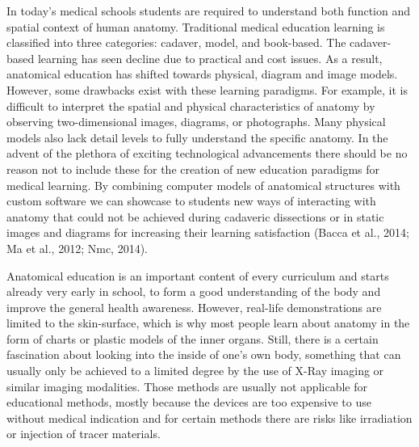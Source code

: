 In today’s medical schools students are required to understand both function and spatial context of human anatomy. Traditional medical education learning is classified into three categories: cadaver, model, and book-based. The cadaver-based learning has seen decline due to practical and cost issues. As a result, anatomical education has shifted towards physical, diagram and image models. However, some drawbacks exist with these learning paradigms. For example, it is difficult to interpret the spatial and physical characteristics of anatomy by observing two-dimensional images, diagrams, or photographs. Many physical models also lack detail levels to fully understand the specific anatomy. 
In the advent of the plethora of exciting technological advancements there should be no reason not to include these for the creation of new education paradigms for medical learning. By combining computer models of anatomical structures with custom software we can showcase to students new ways of interacting with anatomy that could not be achieved during cadaveric dissections or in static images and diagrams for increasing their learning satisfaction (Bacca et al., 2014; Ma et al., 2012; Nmc, 2014).

Anatomical education is an important content of every curriculum and starts already very early in school, to form a good understanding of the body and improve the general health awareness. However, real-life demonstrations are limited to the skin-surface, which is why most people learn about anatomy in the form of charts or plastic models of the inner organs. Still, there is a certain fascination about looking into the inside of one’s own body, something that can usually only be achieved to a limited degree by the use of X-Ray imaging or similar imaging modalities. Those methods are usually not applicable for educational methods, mostly because the devices are too expensive to use without medical indication and for certain methods there are risks like irradiation or injection of tracer materials.

